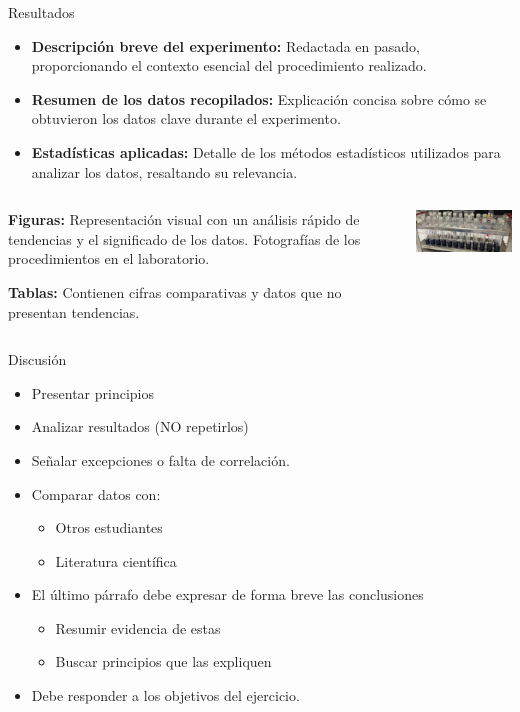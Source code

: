 \documentclass[
11pt, %
]{beamer}
\begin{document}
\begin{frame}{Resultados}
	\begin{itemize}
		\item \textbf{Descripción breve del experimento:} Redactada en pasado, proporcionando el contexto esencial del procedimiento realizado.

		\item \textbf{Resumen de los datos recopilados:} Explicación concisa sobre cómo se obtuvieron los datos clave durante el experimento.

		\item \textbf{Estadísticas aplicadas:} Detalle de los métodos estadísticos utilizados para analizar los datos, resaltando su relevancia.
	\end{itemize}
	\begin{columns}[c]
		\begin{column}{0.45\textwidth}
			\textbf{Figuras:} Representación visual con un análisis rápido de tendencias y el significado de los datos. Fotografías de los procedimientos en el laboratorio.

			\textbf{Tablas:} Contienen cifras comparativas y datos que no presentan tendencias.
		\end{column}
		\begin{column}{0.5\textwidth}
			\centering
			\includegraphics[width=6cm]{resultado01.png} %
		\end{column}
	\end{columns}
\end{frame}

\begin{frame}{Discusión}
	\begin{itemize}
		\item Presentar principios
		\item Analizar resultados (NO repetirlos)
		\item Señalar excepciones o falta de correlación.
		\item Comparar datos con:
		      \begin{itemize}
			      \item Otros estudiantes
			      \item Literatura científica
		      \end{itemize}
		\item El último párrafo debe expresar de forma breve las conclusiones
		      \begin{itemize}
			      \item Resumir evidencia de estas
			      \item Buscar principios que las expliquen
		      \end{itemize}
		\item Debe responder a los objetivos del ejercicio.
	\end{itemize}
\end{frame}
\end{document}
